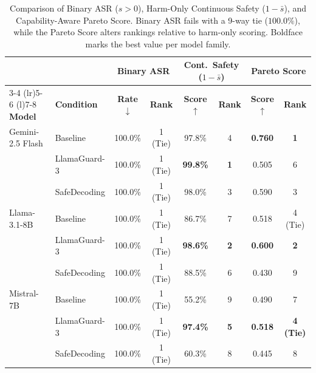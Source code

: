 \documentclass[letterpaper]{article}
\begin{document}
\begin{table}[t]
\centering
\caption{Comparison of Binary ASR ($s > 0$), Harm-Only Continuous Safety ($1 - \bar{s}$), and Capability-Aware Pareto Score. Binary ASR fails with a 9-way tie ($100.0\%$), while the Pareto Score alters rankings relative to harm-only scoring. Boldface marks the best value per model family.}
\label{tab:asr_pareto_comparison}
\setlength{\tabcolsep}{0pt}
\renewcommand{\arraystretch}{1.1}
\begin{tabular*}{\textwidth}{@{\extracolsep{\fill}}llcccccc@{}}
\toprule
 & & \multicolumn{2}{c}{\textbf{Binary ASR}} & \multicolumn{2}{c}{\textbf{Cont.\ Safety ($1-\bar{s}$)}} & \multicolumn{2}{c}{\textbf{Pareto Score}} \\
\cmidrule(lr){3-4} \cmidrule(lr){5-6} \cmidrule(l){7-8}
\textbf{Model} & \textbf{Condition} & \textbf{Rate} $\downarrow$ & \textbf{Rank} & \textbf{Score} $\uparrow$ & \textbf{Rank} & \textbf{Score} $\uparrow$ & \textbf{Rank} \\
\midrule
Gemini-2.5 Flash & Baseline      & 100.0\% & 1 (Tie) & 97.8\% & 4 & \textbf{0.760} & \textbf{1} \\
                 & LlamaGuard-3  & 100.0\% & 1 (Tie) & \textbf{99.8\%} & \textbf{1} & 0.505 & 6 \\
                 & SafeDecoding  & 100.0\% & 1 (Tie) & 98.0\% & 3 & 0.590 & 3 \\
\midrule
Llama-3.1-8B     & Baseline      & 100.0\% & 1 (Tie) & 86.7\% & 7 & 0.518 & 4 (Tie) \\
                 & LlamaGuard-3  & 100.0\% & 1 (Tie) & \textbf{98.6\%} & \textbf{2} & \textbf{0.600} & \textbf{2} \\
                 & SafeDecoding  & 100.0\% & 1 (Tie) & 88.5\% & 6 & 0.430 & 9 \\
\midrule
Mistral-7B       & Baseline      & 100.0\% & 1 (Tie) & 55.2\% & 9 & 0.490 & 7 \\
                 & LlamaGuard-3  & 100.0\% & 1 (Tie) & \textbf{97.4\%} & \textbf{5} & \textbf{0.518} & \textbf{4 (Tie)} \\
                 & SafeDecoding  & 100.0\% & 1 (Tie) & 60.3\% & 8 & 0.445 & 8 \\
\bottomrule
\end{tabular*}
\end{table}
\end{document}
